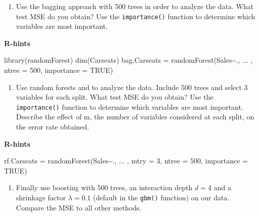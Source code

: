 \documentclass[
]{article}
\newenvironment{Shaded}{\begin{snugshade}}{\end{snugshade}}
\newcommand{\AttributeTok}[1]{\textcolor[rgb]{0.77,0.63,0.00}{#1}}
\newcommand{\ConstantTok}[1]{\textcolor[rgb]{0.00,0.00,0.00}{#1}}
\newcommand{\DecValTok}[1]{\textcolor[rgb]{0.00,0.00,0.81}{#1}}
\newcommand{\FunctionTok}[1]{\textcolor[rgb]{0.00,0.00,0.00}{#1}}
\newcommand{\NormalTok}[1]{#1}
\newcommand{\OtherTok}[1]{\textcolor[rgb]{0.56,0.35,0.01}{#1}}
\newcommand{\SpecialCharTok}[1]{\textcolor[rgb]{0.00,0.00,0.00}{#1}}
\providecommand{\tightlist}{%
  \setlength{\itemsep}{0pt}\setlength{\parskip}{0pt}}
\begin{document}
\begin{enumerate}
\def\labelenumi{\alph{enumi})}
\setcounter{enumi}{3}
\tightlist
\item
  Use the bagging approach with 500 trees in order to analyze the data.
  What test MSE do you obtain? Use the \texttt{importance()} function to
  determine which variables are most important.
\end{enumerate}

\textbf{R-hints}

\begin{Shaded}
\begin{Highlighting}[]
\FunctionTok{library}\NormalTok{(randomForest)}
\FunctionTok{dim}\NormalTok{(Carseats)}
\NormalTok{bag.Carseats }\OtherTok{=} \FunctionTok{randomForest}\NormalTok{(Sales}\SpecialCharTok{\textasciitilde{}}\NormalTok{., ... , }\AttributeTok{ntree =} \DecValTok{500}\NormalTok{, }\AttributeTok{importance =} \ConstantTok{TRUE}\NormalTok{)}
\end{Highlighting}
\end{Shaded}

\begin{enumerate}
\def\labelenumi{\alph{enumi})}
\setcounter{enumi}{4}
\tightlist
\item
  Use random forests and to analyze the data. Include 500 trees and
  select 3 variables for each split. What test MSE do you obtain? Use
  the \texttt{importance()} function to determine which variables are
  most important. Describe the effect of m, the number of variables
  considered at each split, on the error rate obtained.
\end{enumerate}

\textbf{R-hints}

\begin{Shaded}
\begin{Highlighting}[]
\NormalTok{rf.Carseats }\OtherTok{=} \FunctionTok{randomForest}\NormalTok{(Sales}\SpecialCharTok{\textasciitilde{}}\NormalTok{., ... , }\AttributeTok{mtry =} \DecValTok{3}\NormalTok{, }\AttributeTok{ntree =} \DecValTok{500}\NormalTok{, }\AttributeTok{importance =} \ConstantTok{TRUE}\NormalTok{)}
\end{Highlighting}
\end{Shaded}

\begin{enumerate}
\def\labelenumi{\alph{enumi})}
\setcounter{enumi}{5}
\tightlist
\item
  Finally use boosting with 500 trees, an interaction depth \(d=4\) and
  a shrinkage factor \(\lambda=0.1\) (default in the \texttt{gbm()}
  function) on our data. Compare the MSE to all other methods.
\end{enumerate}
\end{document}
